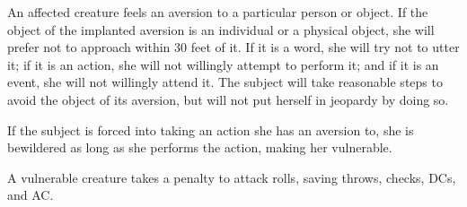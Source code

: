 \spellrng{\rngmed}
\spelldur{\durext}
\begin{spelleffect}
  An affected creature feels an aversion to a particular person or object. If the object of the implanted aversion is an individual or a physical object, she will prefer not to approach within 30 feet of it. If it is a word, she will try not to utter it; if it is an action, she will not willingly attempt to perform it; and if it is an event, she will not willingly attend it. The subject will take reasonable steps to avoid the object of its aversion, but will not put herself in jeopardy by doing so.
  \par If the subject is forced into taking an action she has an aversion to, she is bewildered as long as she performs the action, making her vulnerable.
\end{spelleffect}
\begin{spellnotes}
  A vulnerable creature takes a  penalty to attack rolls, saving throws, checks, DCs, and AC.
\end{spellnotes}

\begin{comment}
\subsubsection{B}
\end{comment}

